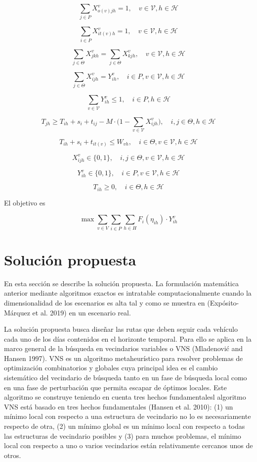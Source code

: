 \documentclass[
]{article}
\begin{document}
\[
\sum_{j \in P} X_{o(v)jh}^v= 1, \quad v \in \mathcal{V}, h\in\mathcal{H}
\]

\[
\sum_{i \in P} X_{it(v)h}^v= 1 , \quad v \in \mathcal{V}, h\in\mathcal{H}
\]

\[
\sum_{j\in\Theta}X_{jkh}^v = \sum_{j\in\Theta}X_{kjh}^v, \quad v \in \mathcal{V}, h\in\mathcal{H}
\]

\[
\sum_{j\in\Theta} X_{ijh}^v = Y_{ih}^v , \quad i\in P, v \in \mathcal{V}, h\in\mathcal{H}
\]

\[
\sum_{v\in \mathcal{V}} Y_{ih}^v \leq 1, \quad i\in P,  h\in\mathcal{H}
\]

\[
T_{jh} \geq T_{ih} + s_i + t_{ij} - M\cdot \big(1-\sum_{v\in \mathcal{V}} X_{ijh}^v\big), \quad i,j \in \Theta, h\in\mathcal{H}
\]

\[
T_{ih} + s_i + t_{it(v)} \leq W_{vh}, \quad i\in \Theta, v \in \mathcal{V}, h\in\mathcal{H}
\]

\[
X_{ijh}^v \in \{0, 1\}, \quad i,j \in \Theta, v \in \mathcal{V}, h\in\mathcal{H}
\]

\[
Y_{ih}^v \in \{0, 1\}, \quad i\in P, v \in \mathcal{V}, h\in\mathcal{H}
\]

\[
T_{ih} \geq 0 ,\quad i\in\Theta, h\in \mathcal{H}
\]

El objetivo es

\[
\max \sum_{v \in V}\sum_{i\in P} \sum_{h\in H} F_i(\eta_{ih})\cdot Y_{ih}^v
\]

\hypertarget{soluciuxf3n-propuesta}{%
\section{Solución propuesta}\label{soluciuxf3n-propuesta}}

En esta sección se describe la solución propuesta. La formulación
matemática anterior mediante algoritmos exactos es intratable
computacionalmente cuando la dimensionalidad de los escenarios es alta
tal y como se muestra en (Expósito-Márquez et al. 2019) en un escenario
real.

La solución propuesta busca diseñar las rutas que deben seguir cada
vehículo cada uno de los días contenidos en el horizonte temporal. Para
ello se aplica en la marco general de la búsqueda en vecindarios
variables o VNS (Mladenović and Hansen 1997). VNS es un algoritmo
metaheurístico para resolver problemas de optimización combinatorios y
globales cuya principal idea es el cambio sistemático del vecindario de
búsqueda tanto en un fase de búsqueda local como en una fase de
perturbación que permita escapar de óptimos locales. Este algoritmo se
construye teniendo en cuenta tres hechos fundamentalesl algoritmo VNS
está basado en tres hechos fundamentales (Hansen et al. 2010): (1) un
mínimo local con respecto a una estructura de vecindario no lo es
necesariamente respecto de otra, (2) un mínimo global es un mínimo local
con respecto a todas las estructuras de vecindario posibles y (3) para
muchos problemas, el mínimo local con respecto a uno o varios
vecindarios están relativamente cercanos unos de otros.
\end{document}
